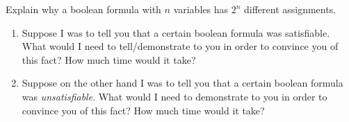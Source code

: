 Explain why a boolean formula with $n$ variables has $2^n$ different assignments.

\begin{enumerate}
    \item Suppose I was to tell you that a certain boolean formula was satisfiable. What would I need to tell/demonstrate to you in order to convince you of this fact? How much time would it take?
    \item Suppose on the other hand I was to tell you that a certain boolean formula was \textit{unsatisfiable}. What would I need to demonstrate to you in order to convince you of this fact? How much time would it take?
\end{enumerate}